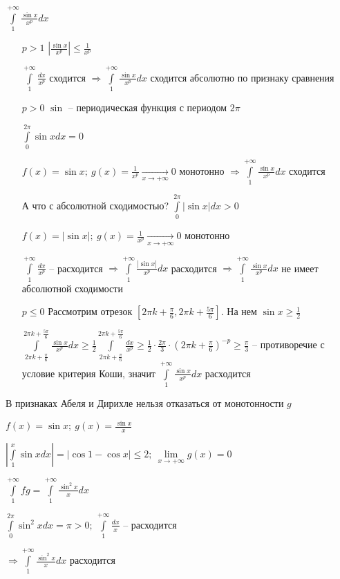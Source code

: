 \documentclass[12pt]{article}
\begin{document}
\begin{Example}{}
    $\int\limits_1^{+ \infty} \frac{\sin{x}}{x^p}dx$

    \begin{itemize}
        \item[$p > 1$] $|\frac{\sin{x}}{x^p}| \leq \frac{1}{x^p}$
        
        $\int\limits_1^{+ \infty} \frac{dx}{x^p}$ сходится $\Rightarrow \int\limits_1^{+ \infty} \frac{\sin{x}}{x^p}dx$ сходится абсолютно по признаку сравнения

        \item[$p > 0$] $\sin$ -- периодическая функция с периодом $2\pi$
        
        $\int\limits_0^{2\pi} \sin{x}dx = 0$

        $f(x) = \sin{x};\ g(x) = \frac{1}{x^p} \xrightarrow[x \to + \infty]{} 0$ монотонно $\Rightarrow \int\limits_1^{+ \infty} \frac{\sin{x}}{x^p}dx$ сходится 

        А что с абсолютной сходимостью? $\int\limits_0^{2\pi} |\sin{x}|dx > 0$

        $f(x) = |\sin{x}|;\ g(x) = \frac{1}{x^p} \xrightarrow[x \to + \infty]{} 0$ монотонно

        $\int\limits_1^{+ \infty} \frac{dx}{x^p}$ -- расходится $\Rightarrow \int\limits_1^{+ \infty} \frac{|\sin{x}|}{x^p}dx$ расходится $\Rightarrow \int\limits_1^{+ \infty} \frac{\sin{x}}{x^p}dx$ не имеет абсолютной сходимости

        \item[$p \leq 0$] Рассмотрим отрезок $[2\pi k + \frac{\pi}{6}, 2\pi k + \frac{5\pi}{6}]$. На нем $\sin{x} \geq \frac{1}{2}$
        
        $\int\limits_{2\pi k + \frac{\pi}{6}}^{2\pi k + \frac{5\pi}{6}} \frac{\sin{x}}{x^p}dx \geq \frac{1}{2} \int\limits_{2\pi k + \frac{\pi}{6}}^{2\pi k + \frac{5\pi}{6}} \frac{dx}{x^p} \geq \frac{1}{2} \cdot \frac{2\pi}{3} \cdot (2\pi k + \frac{\pi}{6})^{-p} \geq \frac{\pi}{3}$ -- противоречие с условие критерия Коши, значит $\int\limits_1^{+ \infty} \frac{\sin{x}}{x^p}dx$ расходится
    \end{itemize}
\end{Example}

\begin{Remark}{}
    В признаках Абеля и Дирихле нельзя отказаться от монотонности $g$

    $f(x) = \sin{x};\ g(x) = \frac{\sin{x}}{x}$

    $|\int\limits_1^x \sin{x}dx| = |\cos{1} - \cos{x}| \leq 2;\ \lim\limits_{x \to + \infty} g(x) = 0$

    $\int\limits_1^{+ \infty} fg = \int\limits_1^{+ \infty} \frac{\sin^2{x}}{x}dx$ 

    $\int\limits_0^{2\pi} \sin^2{x}dx = \pi > 0;\ \int\limits_1^{+ \infty} \frac{dx}{x}$ -- расходится

    $\Rightarrow \int\limits_1^{+ \infty} \frac{\sin^2{x}}{x}dx$ расходится
\end{Remark}
\end{document}
